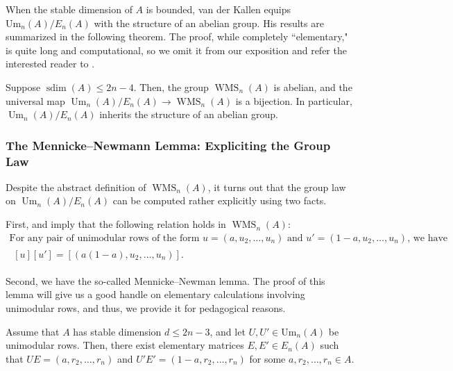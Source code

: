 When the stable dimension of $A$ is bounded, van der Kallen \cite[Theorems 3.6 and 4.1]{vdk} equips $\mathrm{Um}_n(A)/E_n(A)$ with the structure of an abelian group. His results are summarized in the following theorem. The proof, while completely ``elementary," is quite long and computational, so we omit it from our exposition and refer the interested reader to \cite[Sections 3 and 4]{vdk}.

\begin{theorem}
    Suppose $\operatorname{sdim}(A) \leq 2n-4$. Then, the group $\operatorname{WMS}_n(A)$ is abelian, and the universal map $\operatorname{Um}_n(A)/E_n(A) \to \operatorname{WMS}_n(A)$ is a bijection. In particular, $\operatorname{Um}_n(A)/E_n(A)$ inherits the structure of an abelian group.
\end{theorem}

\subsubsection{The Mennicke--Newmann Lemma: Expliciting the Group Law}

Despite the abstract definition of $\operatorname{WMS}_n(A)$, it turns out that the group law on $\operatorname{Um}_n(A)/E_n(A)$ can be computed rather explicitly using two facts.

First, \cite[Lemma 3.5(v)]{vdk} and \cite[Lemma 3.1]{vdk2} imply that the following relation holds in $\operatorname{WMS}_n(A)$:
\begin{gather}\label{eqn:mn_relation}
\text{For any pair of unimodular rows of the form $u = (a,u_2,\ldots,u_n)$ and $u' = (1-a,u_2,\ldots,u_n)$, we have}\\ 
\label{eqn:mn_relation2}\begin{align}
    [u][u'] = [(a(1-a),u_2,\ldots,u_n)].
\end{align}
\end{gather}

Second, we have the so-called Mennicke--Newman lemma. The proof of this lemma will give us a good handle on elementary calculations involving unimodular rows, and thus, we provide it for pedagogical reasons.

\begin{lemma}\label{lem:mn}
    Assume that $A$ has stable dimension $d \leq 2n-3$, and let $U,U' \in \mathrm{Um}_n(A)$ be unimodular rows. Then, there exist elementary matrices $E,E' \in E_n(A)$ such that $UE = (a,r_2,\ldots,r_n)$ and $U'E' = (1-a,r_2,\ldots,r_n)$ for some $a,r_2,\ldots,r_n \in A$.
\end{lemma}

